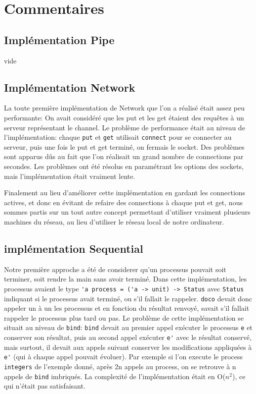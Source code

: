 \documentclass[a4paper]{article}
\begin{document}
\section{Commentaires}

\subsection{Implémentation Pipe}
vide
\subsection{Implémentation Network}
La toute première implémentation de Network que l'on a réalisé était assez
peu performante: On avait considéré que les put et les get étaient des
requêtes à un serveur représentant le channel. Le problème de performance
était au niveau de l'implémentation: chaque \verb!put! et \verb!get! utilisait
\verb!connect! pour se connecter au serveur, puis une fois le put et get
terminé, on fermais le socket. Des problèmes sont apparus dûs au fait que l'on réalisait
un grand nombre de connections par secondes. Les problèmes ont été résolus
en paramétrant les options des sockets,
mais l'implémentation était vraiment lente.

Finalement au lieu d'améliorer cette implémentation en gardant les
connections actives, et donc en évitant de refaire des connections à chaque
put et get, nous sommes partis sur un tout autre concept permettant
d'utiliser vraiment plusieurs machines du réseau, au lieu d'utiliser le
réseau local de notre ordinateur.
\subsection{implémentation Sequential}
Notre première approche a été de considerer qu'un processus pouvait soit
terminer, soit rendre la main sans avoir terminé. Dans cette
implémentation, les processus avaient le type \verb!'a process = ('a -> unit) -> Status! avec \verb!Status! indiquant si le processus avait terminé, ou s'il fallait le rappeler. \verb!doco! devait donc appeler un à un les processus et en fonction du résultat renvoyé, savait s'il fallait rappeler le processus plus tard ou pas. 
Le problème de cette implémentation se situait au niveau de \verb!bind!: \verb!bind! devait au premier appel exécuter le processus \verb!e! et conserver son résultat, puis au second appel exécuter \verb!e'! avec le résultat conservé, mais surtout, il devait aux appels suivant conserver les modifications appliquées à \verb!e'! (qui à chaque appel pouvait évoluer). Par exemple si l'on execute le process \verb!integers! de l'exemple donné, après 2n appels au process, on se retrouve à n appels de \verb!bind! imbriqués. La complexité de l'implémentation était en O($n^2$), ce qui n'était pas satisfaisant.
\end{document}
